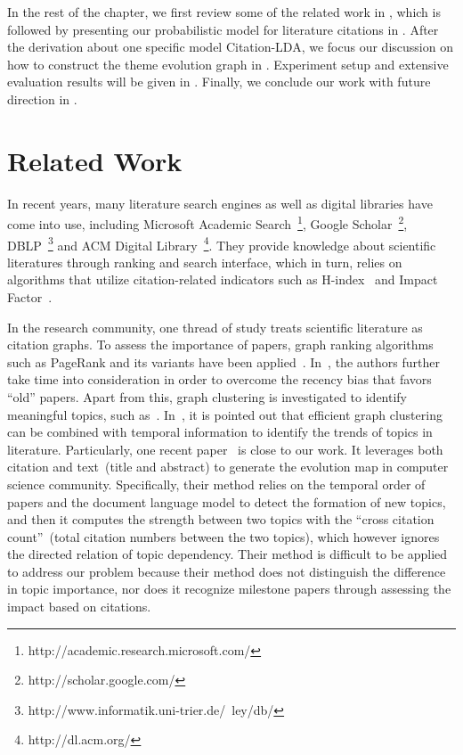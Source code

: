 In the rest of the chapter, we first review some of the related work in
, which is followed by presenting our probabilistic
model for literature citations in . After the
derivation about one specific model Citation-LDA, we focus our discussion on how
to construct the theme evolution graph in . Experiment
setup and extensive evaluation results will be given in
. Finally, we conclude our work with future direction in
.

\section{Related Work}\label{sec::citation-related}

In recent years, many literature search engines as well as digital libraries
have come into use, including Microsoft Academic
Search~\footnote{http://academic.research.microsoft.com/}, Google
Scholar~\footnote{ http://scholar.google.com/}, DBLP~\footnote{
http://www.informatik.uni-trier.de/~ley/db/} and ACM Digital
Library~\footnote{http://dl.acm.org/}. They provide knowledge about scientific
literatures through ranking and search interface, which in turn, relies on
algorithms that utilize citation-related indicators such as
H-index~\cite{hirsch2005index} and Impact Factor~\cite{garfield2006history}.

In the research community, one thread of study treats scientific literature as
citation graphs. To assess the importance of papers, graph ranking algorithms
such as PageRank and its variants have been
applied~\cite{ghosh2011time,radev2009acl,sayyadi2009futurerank,walker2007ranking}.
In~\cite{ghosh2011time}, the authors further take time into consideration in
order to overcome the recency bias that favors ``old'' papers. Apart from this,
graph clustering is investigated to identify meaningful topics, such
as~\cite{bolelli2006clustering,flake2004graph,popescul2000clustering,
qazvinian2008scientific}. In~\cite{popescul2000clustering}, it is pointed out
that efficient graph clustering can be combined with temporal information to
identify the trends of topics in literature.  Particularly, one recent
paper~\cite{jo2011web} is close to our work. It leverages both citation and
text~(title and abstract) to generate the evolution map in computer science
community. Specifically, their method relies on the temporal order of papers and
the document language model to detect the formation of new topics, and then it
computes the strength between two topics with the ``cross citation
count''~(total citation numbers between the two topics), which however ignores
the directed relation of topic dependency.  Their method is difficult to be
applied to address our problem because their method does not distinguish the
difference in topic importance, nor does it recognize milestone papers through
assessing the impact based on citations.

